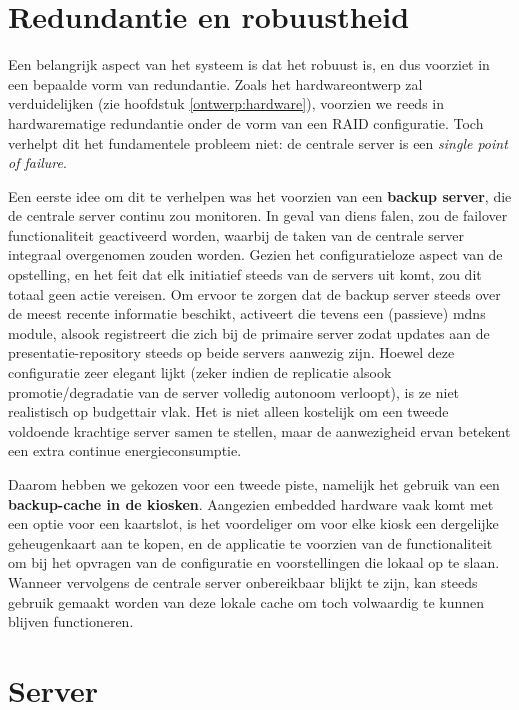 \section{Redundantie en robuustheid}
\label{sec:redundantie}

Een belangrijk aspect van het systeem is dat het robuust is, en dus voorziet in een bepaalde vorm van redundantie. Zoals het hardwareontwerp zal verduidelijken (zie hoofdstuk \ref{ontwerp:hardware}), voorzien we reeds in hardwarematige redundantie onder de vorm van een RAID configuratie. Toch verhelpt dit het fundamentele probleem niet: de centrale server is een \emph{single point of failure}.

Een eerste idee om dit te verhelpen was het voorzien van een \textbf{backup server}, die de centrale server continu zou monitoren. In geval van diens falen, zou de failover functionaliteit geactiveerd worden, waarbij de taken van de centrale server integraal overgenomen zouden worden. Gezien het configuratieloze aspect van de opstelling, en het feit dat elk initiatief steeds van de servers uit komt, zou dit totaal geen actie vereisen. Om ervoor te zorgen dat de backup server steeds over de meest recente informatie beschikt, activeert die tevens een (passieve) \ac{mdns} module, alsook registreert die zich bij de primaire server zodat updates aan de presentatie-repository steeds op beide servers aanwezig zijn.
Hoewel deze configuratie zeer elegant lijkt (zeker indien de replicatie alsook promotie/degradatie van de server volledig autonoom verloopt), is ze niet realistisch op budgettair vlak. Het is niet alleen kostelijk om een tweede voldoende krachtige server samen te stellen, maar de aanwezigheid ervan betekent een extra continue energieconsumptie.

Daarom hebben we gekozen voor een tweede piste, namelijk het gebruik van een \textbf{backup-cache in de kiosken}. Aangezien embedded hardware vaak komt met een optie voor een kaartslot, is het voordeliger om voor elke kiosk een dergelijke geheugenkaart aan te kopen, en de applicatie te voorzien van de functionaliteit om bij het opvragen van de configuratie en voorstellingen die lokaal op te slaan. Wanneer vervolgens de centrale server onbereikbaar blijkt te zijn, kan steeds gebruik gemaakt worden van deze lokale cache om toch volwaardig te kunnen blijven functioneren.

\section{Server}
\label{ontwerp:applicatie:server}

